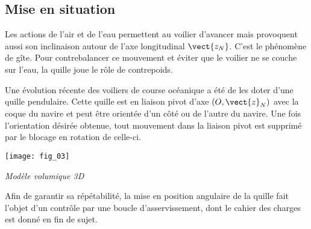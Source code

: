 \ifprof
\else
\begin{multicols}{2}
\fi


\section*{Mise en situation}
\ifprof
\else

Les actions de l'air et de l'eau permettent au voilier d'avancer mais provoquent aussi son inclinaison autour de l'axe longitudinal $\vect{z_N}$. C’est le phénomène de gîte. Pour contrebalancer ce mouvement et éviter que le voilier ne se couche sur l’eau, la quille joue le rôle de contrepoids. 



Une évolution récente des voiliers de course océanique a été de les doter d’une quille pendulaire. Cette quille est en liaison pivot d’axe $\left(O,\vect{z}_N \right)$ avec la coque du navire et peut être orientée d’un côté ou de l’autre du navire. Une fois l’orientation désirée obtenue, tout mouvement dans la liaison pivot est supprimé par le blocage en rotation de celle-ci. 

\begin{center}
\texttt{[image: fig\_03]}

\textit{Modèle volumique 3D}
\end{center}


Afin de garantir sa répétabilité, la mise en position angulaire de la quille fait l’objet d’un contrôle par une boucle d’asservissement, dont le cahier des charges est donné en fin de sujet.
%
\fi



\end{multicols}
